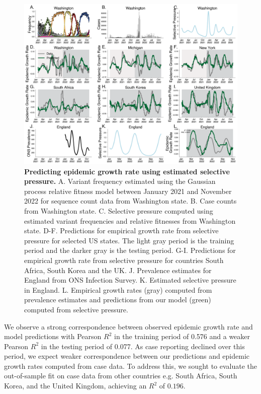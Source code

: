 \documentclass[11pt,oneside,letterpaper]{article}
\begin{document}
\begin{figure}[h]
    \centering
    \includegraphics[width=1.0\linewidth]{./figures/selective_pressure_prediction.png}
    \caption{
      \textbf{Predicting epidemic growth rate using estimated selective pressure.}
      A. Variant frequency estimated using the Gaussian process relative fitness model between January 2021 and November 2022 for sequence count data from Washington state.
      B. Case counts from Washington state.
      C. Selective pressure computed using estimated variant frequencies and relative fitnesses from Washington state.
      D-F. Predictions for empirical growth rate from selective pressure for selected US states.
      The light gray period is the training period and the darker gray is the testing period.
      G-I. Predictions for empirical growth rate from selective pressure for countries South Africa, South Korea and the UK.
      J. Prevalence estimates for England from ONS Infection Survey.
      K. Estimated selective pressure in England.
      L. Empirical growth rates (gray) computed from prevalence estimates and predictions from our model (green) computed from selective pressure.
    }
    \label{fig:selective_pressure_prediction}
\end{figure}

We observe a strong correspondence between observed epidemic growth rate and model predictions with Pearson $R^2$ in the training period of 0.576 and a weaker Pearson $R^2$ in the testing period of 0.077.
As case reporting declined over this period, we expect weaker correspondence between our predictions and epidemic growth rates computed from case data.
To address this, we sought to evaluate the out-of-sample fit on case data from other countries e.g. South Africa, South Korea, and the United Kingdom, achieving an $R^2$ of $0.196$.
\end{document}
